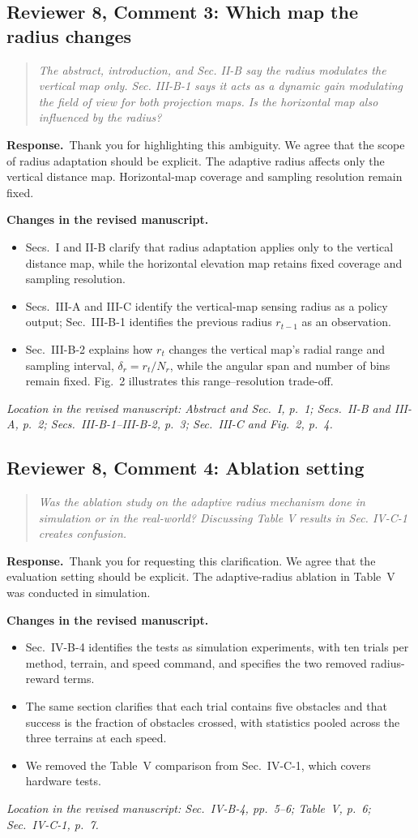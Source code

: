 \documentclass[11pt]{article}
\newenvironment{reviewcomment}{\begin{quote}\color{reviewblue}\itshape}{\end{quote}}
\newcommand{\Response}{\par\noindent\textbf{Response.}\ }
\newcommand{\Changes}{\par\noindent\textbf{Changes in the revised manuscript.}\ }
\newcommand{\Location}[1]{\par\noindent\textit{Location in the revised manuscript: #1}}
\begin{document}
\subsection*{Reviewer 8, Comment 3: Which map the radius changes}
\begin{reviewcomment}
The abstract, introduction, and Sec. II-B say the radius modulates the vertical map only. Sec. III-B-1 says it acts as a dynamic gain modulating the field of view for both projection maps. Is the horizontal map also influenced by the radius?
\end{reviewcomment}
\Response Thank you for highlighting this ambiguity. We agree that the scope of radius adaptation should be explicit. The adaptive radius affects only the vertical distance map. Horizontal-map coverage and sampling resolution remain fixed.
\Changes
\begin{itemize}
    \item Secs.~I and II-B clarify that radius adaptation applies only to the vertical distance map, while the horizontal elevation map retains fixed coverage and sampling resolution.
    \item Secs.~III-A and III-C identify the vertical-map sensing radius as a policy output; Sec.~III-B-1 identifies the previous radius $r_{t-1}$ as an observation.
    \item Sec.~III-B-2 explains how $r_t$ changes the vertical map's radial range and sampling interval, $\delta_r=r_t/N_r$, while the angular span and number of bins remain fixed. Fig.~2 illustrates this range--resolution trade-off.
\end{itemize}
\Location{Abstract and Sec.~I, p.~1; Secs.~II-B and III-A, p.~2; Secs.~III-B-1--III-B-2, p.~3; Sec.~III-C and Fig.~2, p.~4.}



\subsection*{Reviewer 8, Comment 4: Ablation setting}
\begin{reviewcomment}
Was the ablation study on the adaptive radius mechanism done in simulation or in the real-world? Discussing Table V results in Sec. IV-C-1 creates confusion.
\end{reviewcomment}
\Response Thank you for requesting this clarification. We agree that the evaluation setting should be explicit. The adaptive-radius ablation in Table~V was conducted in simulation.
\Changes
\begin{itemize}
    \item Sec.~IV-B-4 identifies the tests as simulation experiments, with ten trials per method, terrain, and speed command, and specifies the two removed radius-reward terms.
    \item The same section clarifies that each trial contains five obstacles and that success is the fraction of obstacles crossed, with statistics pooled across the three terrains at each speed.
    \item We removed the Table~V comparison from Sec.~IV-C-1, which covers hardware tests.
\end{itemize}
\Location{Sec.~IV-B-4, pp.~5--6; Table~V, p.~6; Sec.~IV-C-1, p.~7.}
\end{document}
